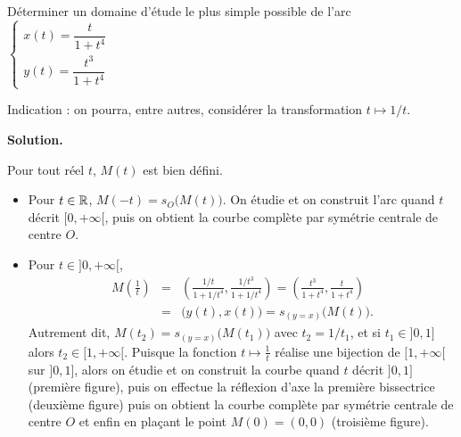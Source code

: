 \documentclass[class=report,crop=false]{standalone}
\begin{document}
\begin{exemple}
Déterminer un domaine d'étude le plus simple possible de l'arc
$\left\{
\begin{array}{l}
x(t)=\dfrac{t}{1+t^4}\\
y(t)=\dfrac{t^3}{1+t^4}
\end{array}
\right.$

Indication : on pourra, entre autres, considérer la transformation $t\mapsto 1/t$.

\medskip
\textbf{Solution.}

Pour tout réel $t$, $M(t)$ est bien défini.

\begin{itemize}
  \item Pour $t\in\mathbb{R}$, $M(-t)=s_O\big(M(t)\big)$.
On étudie et on construit l'arc quand $t$ décrit $[0,+\infty[$, puis on obtient la courbe
complète par symétrie centrale de centre $O$.

  \item Pour $t\in]0,+\infty[$,
\begin{eqnarray*}
M\left(\frac{1}{t}\right)
  &=& \left(\frac{1/t}{1+1/t^4},\frac{1/t^3}{1+1/t^4}\right)=
\left(\frac{t^3}{1+t^4},\frac{t}{1+t^4}\right) \\
  &=& \big(y(t),x(t)\big)=s_{(y=x)}\big(M(t)\big).
\end{eqnarray*}
Autrement dit, $M(t_2) = s_{(y=x)}\big(M(t_1)\big)$ avec $t_2=1/t_1$,
et si $t_1\in]0,1]$ alors $t_2\in[1,+\infty[$.
Puisque la
fonction $t\mapsto\frac{1}{t}$ réalise une
bijection de $[1,+\infty[$ sur $]0,1]$, alors on étudie et on construit
la courbe quand $t$ décrit $]0,1]$ (première figure),
puis on effectue la réflexion d'axe
la première bissectrice (deuxième figure)
puis on obtient la courbe complète par symétrie centrale de centre $O$ et
enfin en plaçant le point $M(0)=(0,0)$ (troisième figure).
\end{itemize}


\end{exemple}
\end{document}
